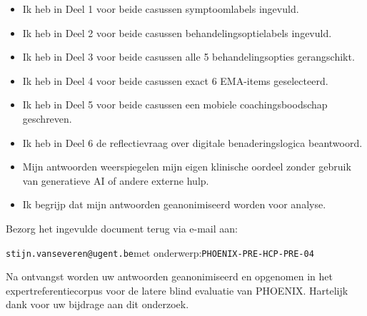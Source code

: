\documentclass[11pt,a4paper]{article}
\begin{document}
\begin{instrbox}[title=Checklist voor terugbezorging]
\begin{itemize}
\item[$\square$] Ik heb in Deel 1 voor beide casussen symptoomlabels ingevuld.
\item[$\square$] Ik heb in Deel 2 voor beide casussen behandelingsoptielabels ingevuld.
\item[$\square$] Ik heb in Deel 3 voor beide casussen alle 5 behandelingsopties gerangschikt.
\item[$\square$] Ik heb in Deel 4 voor beide casussen exact 6 EMA-items geselecteerd.
\item[$\square$] Ik heb in Deel 5 voor beide casussen een mobiele coachingsboodschap geschreven.
\item[$\square$] Ik heb in Deel 6 de reflectievraag over digitale benaderingslogica beantwoord.
\item[$\square$] Mijn antwoorden weerspiegelen mijn eigen klinische oordeel zonder gebruik van generatieve AI of andere externe hulp.
\item[$\square$] Ik begrijp dat mijn antwoorden geanonimiseerd worden voor analyse.
\end{itemize}
\end{instrbox}

\medskip
Bezorg het ingevulde document terug via e-mail aan:
\begin{center}
\texttt{stijn.vanseveren@ugent.be}\quad met onderwerp:\quad \texttt{PHOENIX-PRE-HCP-PRE-04}
\end{center}

\vspace{0.5em}
\begin{tcolorbox}[colback=AccentBlue,colframe=PrimaryBlue,arc=2mm,boxrule=0.6pt,left=8pt,right=8pt,top=7pt,bottom=7pt]
\small\centering
Na ontvangst worden uw antwoorden geanonimiseerd en opgenomen in het expertreferentiecorpus
voor de latere blind evaluatie van PHOENIX. Hartelijk dank voor uw bijdrage aan dit onderzoek.
\end{tcolorbox}
\end{document}
